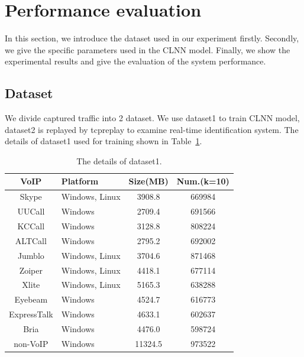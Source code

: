 \documentclass[conference]{IEEEtran}
\begin{document}

\section{Performance evaluation}
\label{sec:performanceevaluation}
In this section, we introduce the dataset used in our experiment firstly. Secondly, we give the specific parameters used in the CLNN model. Finally, we show the experimental results and give the evaluation of the system performance.
\subsection{Dataset}
\label{sec:dataset}
We divide captured traffic into 2 dataset. We use dataset1 to train CLNN model, dataset2 is replayed by tcpreplay to examine real-time identification system. The details of dataset1 used for training shown in Table~\ref{tab:traffic}.

\begin{table}[htbp]
  \caption{The details of dataset1.}
  \label{tab:traffic}
  \centering
  \begin{tabular}{c l c c}
    \hline
    \textbf{VoIP} & \textbf{Platform} & \textbf{Size(MB)}& \textbf{Num.(k=10)}\\
    \hline
    Skype      & Windows, Linux  & 3908.8  &  669984  \\
    UUCall      & Windows  & 2709.4  &  691566  \\
    KCCall      & Windows  & 3128.8  &  808224  \\
    ALTCall      & Windows  & 2795.2  &  692002  \\
    Jumblo      & Windows, Linux  & 3704.6  &  871468  \\
    Zoiper      & Windows, Linux  & 4418.1  &  677114  \\
    Xlite      & Windows, Linux  & 5165.3  &  638288  \\
    Eyebeam      & Windows  & 4524.7  &  616773  \\
    ExpressTalk      & Windows  & 4633.1  &  602637  \\
    Bria      & Windows  & 4476.0  &  598724  \\
    non-VoIP      & Windows  & 11324.5  &  973522  \\
    \hline
  \end{tabular}
\end{table}
\end{document}
